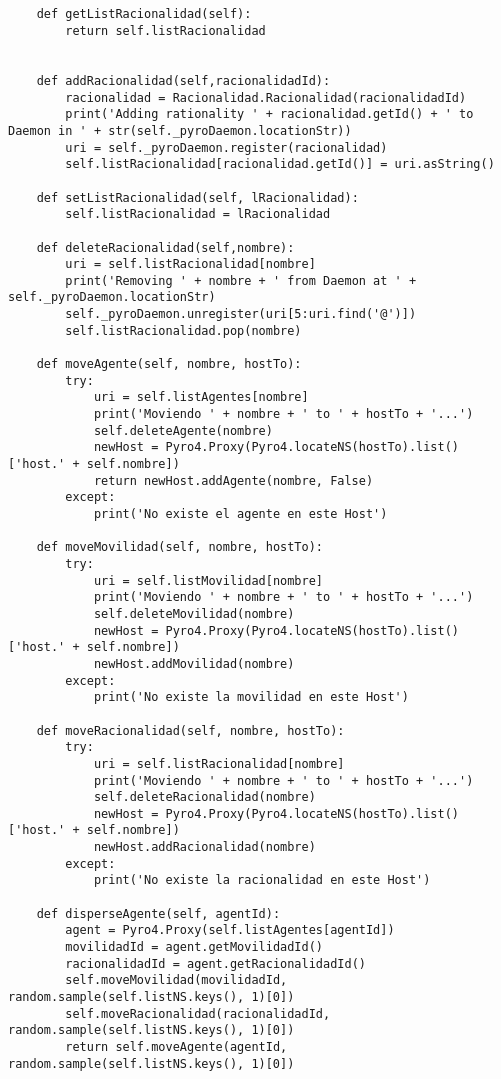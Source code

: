 \documentclass{article}
\begin{document}
\begin{lstlisting}
        
            
    def getListRacionalidad(self):
        return self.listRacionalidad

        
    def addRacionalidad(self,racionalidadId):
        racionalidad = Racionalidad.Racionalidad(racionalidadId)
        print('Adding rationality ' + racionalidad.getId() + ' to Daemon in ' + str(self._pyroDaemon.locationStr))
        uri = self._pyroDaemon.register(racionalidad)
        self.listRacionalidad[racionalidad.getId()] = uri.asString()
        
    def setListRacionalidad(self, lRacionalidad):
        self.listRacionalidad = lRacionalidad
            
    def deleteRacionalidad(self,nombre):
        uri = self.listRacionalidad[nombre]
        print('Removing ' + nombre + ' from Daemon at ' + self._pyroDaemon.locationStr)
        self._pyroDaemon.unregister(uri[5:uri.find('@')])
        self.listRacionalidad.pop(nombre)
     
    def moveAgente(self, nombre, hostTo):  
        try:
            uri = self.listAgentes[nombre]
            print('Moviendo ' + nombre + ' to ' + hostTo + '...')
            self.deleteAgente(nombre)
            newHost = Pyro4.Proxy(Pyro4.locateNS(hostTo).list()['host.' + self.nombre])
            return newHost.addAgente(nombre, False)
        except:
            print('No existe el agente en este Host')

    def moveMovilidad(self, nombre, hostTo):  
        try:
            uri = self.listMovilidad[nombre]
            print('Moviendo ' + nombre + ' to ' + hostTo + '...')
            self.deleteMovilidad(nombre)
            newHost = Pyro4.Proxy(Pyro4.locateNS(hostTo).list()['host.' + self.nombre])
            newHost.addMovilidad(nombre)
        except:
            print('No existe la movilidad en este Host')

    def moveRacionalidad(self, nombre, hostTo):  
        try:
            uri = self.listRacionalidad[nombre]
            print('Moviendo ' + nombre + ' to ' + hostTo + '...')
            self.deleteRacionalidad(nombre)
            newHost = Pyro4.Proxy(Pyro4.locateNS(hostTo).list()['host.' + self.nombre])
            newHost.addRacionalidad(nombre)
        except:
            print('No existe la racionalidad en este Host')

    def disperseAgente(self, agentId):
        agent = Pyro4.Proxy(self.listAgentes[agentId])
        movilidadId = agent.getMovilidadId()
        racionalidadId = agent.getRacionalidadId()
        self.moveMovilidad(movilidadId, random.sample(self.listNS.keys(), 1)[0])
        self.moveRacionalidad(racionalidadId, random.sample(self.listNS.keys(), 1)[0])
        return self.moveAgente(agentId, random.sample(self.listNS.keys(), 1)[0])
        

\end{lstlisting}
\end{document}
